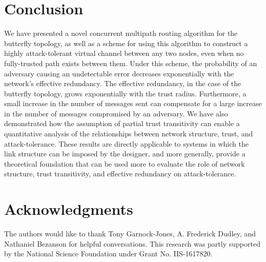 \documentclass{sig-alternate-05-2015}
\begin{document}
\section{Conclusion}
\label{sec-conclusion}

We have presented a novel concurrent multipath routing algorithm for the butterfly
topology,
as well as a scheme for using this algorithm to construct a highly attack-tolerant
virtual channel between any two nodes, even when no fully-trusted path exists
between them.
Under this scheme, the probability of an adversary causing an undetectable error
decreases exponentially with the network's effective redundancy.
The effective redundancy, in the case of the butterfly topology,
grows exponentially with the trust radius.
Furthermore, a small increase in the number of messages sent can compensate
for a large increase in the number of messages compromised by an adversary.
We have also demonstrated how the assumption of partial trust
transitivity can enable a quantitative analysis of the
relationships between network structure, trust, and attack-tolerance.
These results are directly applicable to systems in which the link
structure can be imposed by the designer,
and more generally, provide a theoretical foundation that can be used more to evaluate
the role of network structure, trust transitivity, and effective redundancy
on attack-tolerance.

\section{Acknowledgments}
The authors would like to thank Tony Garnock-Jones, A. Frederick Dudley, and
Nathaniel Bezanson for helpful conversations.
This research was partly supported by the National Science Foundation under Grant No. IIS-1617820.

%

%
%
%
\end{document}
